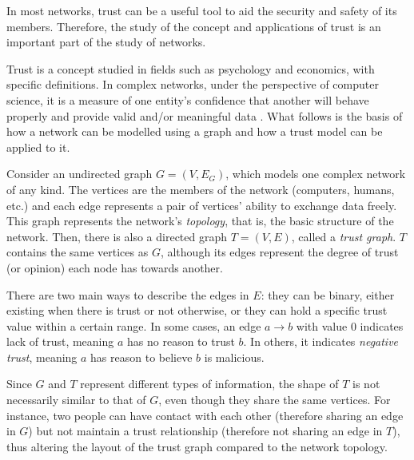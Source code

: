 
In most networks, trust can be a useful tool to aid the security and safety of its members.
Therefore, the study of the concept and applications of trust is an important part of the study of networks. 

Trust is a concept studied in fields such as psychology and economics, with specific definitions.
In complex networks, under the perspective of computer science, it is a measure of one entity's confidence that another will behave properly and provide valid and/or meaningful data \citep{sherchan2013survey}.
What follows is the basis of how a network can be modelled using a graph and how a trust model can be applied to it.

Consider an undirected graph $G = (V, E_G)$, which models one complex network of any kind.
The vertices are the members of the network (computers, humans, etc.) and each edge represents a pair of vertices' ability to exchange data freely.
This graph represents the network's \textit{topology}, that is, the basic structure of the network.
Then, there is also a directed graph $T = (V, E)$, called a \textit{trust graph}.
$T$ contains the same vertices as $G$, although its edges represent the degree of trust (or opinion) each node has towards another.

There are two main ways to describe the edges in $E$: they can be binary, either existing when there is trust or not otherwise, or they can hold a specific trust value within a certain range.
In some cases, an edge $a\rightarrow b$ with value 0 indicates lack of trust, meaning $a$ has no reason to trust $b$.
In others, it indicates \textit{negative trust}, meaning $a$ has reason to believe $b$ is malicious.

Since $G$ and $T$ represent different types of information, the shape of $T$ is not necessarily similar to that of $G$, even though they share the same vertices.
For instance, two people can have contact with each other (therefore sharing an edge in $G$) but not maintain a trust relationship (therefore not sharing an edge in $T$), thus altering the layout of the trust graph compared to the network topology.

